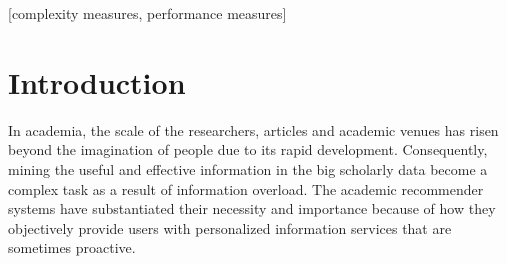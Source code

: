 \documentclass[9pt]{acm_proc_article-sp}
\begin{document}
\maketitle
\begin{abstract}
In this work, we propose AVERec, a novel random walk based academic venue recommendation model. AVERec models the co-publishing network with two kinds of associations, i.e. co-author relations and author-venue relations. We exploit three academic factors to define a transfer matrix with bias which drives a random walk with restart model running on the co-publishing network. The three academic factors, i.e. co-publishing frequency, weight of relations and similar-level preferred, are inspired by that, researchers are more likely to contact academic entities with high co-publishing frequency and similar academic level, as well as the weight of the two kinds of associations should be differentiated. We conduct extensive experiments on DBLP data set in order to measure AVERec. The results demonstrate that AVERec significantly improves the performance on precision, recall and F1 when compared to the baseline method.
\end{abstract}

[complexity measures, performance measures]



\section{Introduction}
In academia, the scale of the researchers, articles and academic venues has risen beyond the imagination of people due to its rapid development. Consequently, mining the useful and effective information in the big scholarly data become a complex task as a result of information overload. The academic recommender systems have substantiated their necessity and importance because of how they objectively provide users with personalized information services that are sometimes proactive.
\end{document}
